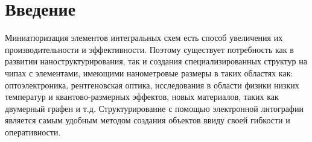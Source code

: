 \chapter*{Введение}

Миниатюризация элементов интегральных схем есть способ увеличения их
производительности и эффективности. Поэтому существует потребность как
в развитии наноструктурирования, так и создания специализированных
структур на чипах с элементами, имеющими нанометровые размеры в таких
областях как: оптоэлектроника, рентгеновская оптика, исследования в
области физики низких температур и квантово-размерных эффектов, новых
материалов, таких как двумерный графен и т.д.
Структурирование с помощью электронной литографии является самым
удобным методом создания объектов ввиду своей гибкости и оперативности.
